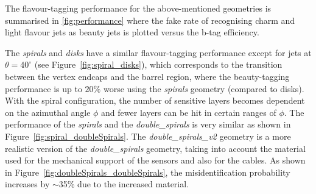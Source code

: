 The flavour-tagging performance for the above-mentioned geometries is
summarised in \cref{fig:performance} where the fake rate of
recognising charm and light flavour jets as beauty jets is
plotted versus the b-tag efficiency.

The \emph{spirals} and \emph{disks} have a similar flavour-tagging
performance except for jets at $\theta=40^{\circ}$ (see
Figure~\ref{fig:spiral_disks}), which corresponds to the transition
between the vertex endcaps and the barrel region, where the
beauty-tagging performance is up to $20\%$ worse using the
\emph{spirals} geometry (compared to disks). With the spiral
configuration, the number of sensitive layers becomes dependent on the
azimuthal angle $\phi$ and fewer layers can be hit in certain ranges
of $\phi$. The performance of the \emph{spirals} and the
\emph{double\_spirals} is very similar as shown in
Figure~\ref{fig:spiral_doubleSpirals}.  The \emph{double\_spirals\_v2}
geometry is a more realistic version of the \emph{double\_spirals}
geometry, taking into account the material used for the mechanical
support of the sensors and also for the cables. As shown in
Figure~\ref{fig:doubleSpirals_doubleSpirals}, the misidentification
probability increases by $\sim$35\% due to the increased material.


